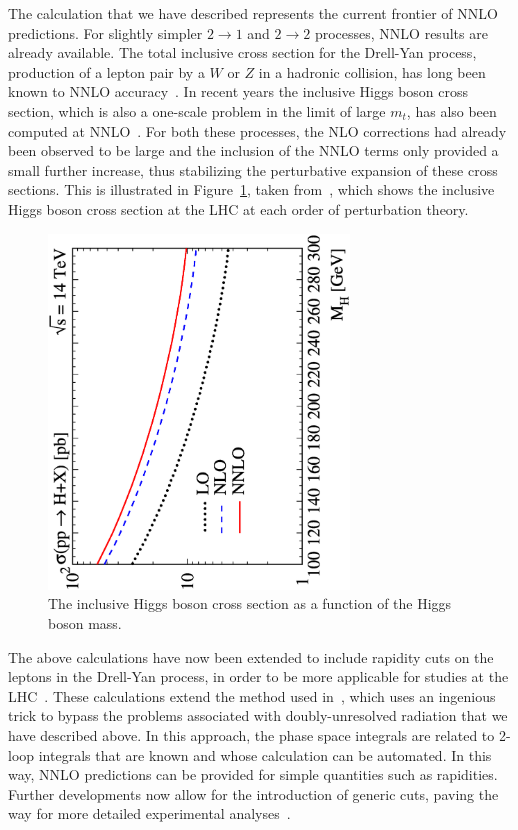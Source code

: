\documentclass[12pt]{iopart}
\begin{document}
The calculation that we have described represents the current frontier of NNLO
predictions. For slightly simpler $2 \to 1$ and $2 \to 2$ processes, NNLO results
are already available. The total inclusive cross section for the Drell-Yan
process, production of a lepton pair by a $W$ or $Z$ in a hadronic collision, has
long been known to NNLO accuracy~\cite{Hamberg:1990np}. In recent years the
inclusive Higgs boson cross section, which is also a one-scale problem in the
limit of large $m_t$, has also been computed at
NNLO~\cite{Harlander:2002wh,Anastasiou:2002yz}. For both these processes, the NLO
corrections had already been observed to be large and the inclusion of the NNLO
terms only provided a small further increase, thus stabilizing the perturbative
expansion of these cross sections. This is illustrated in Figure~\ref{fig:hxsec},
taken from~\cite{Harlander:2002wh},
which shows the inclusive Higgs boson cross section at the LHC at each order of
perturbation theory.
%
\begin{figure}[t]
\begin{center}
\includegraphics[width=8cm,angle=-90]{higgsxsec.eps}
\end{center}
\caption{The inclusive Higgs boson cross section as a function of the
Higgs boson mass.}
\label{fig:hxsec}
\end{figure}

The above calculations have now been extended to include rapidity cuts on the
leptons in the Drell-Yan process, in order to be more applicable for studies at
the LHC~\cite{Anastasiou:2003yy}. These calculations extend the method used
in~\cite{Anastasiou:2002yz}, which uses an ingenious trick to bypass the problems
associated with doubly-unresolved radiation that we have described above. In this
approach, the phase space integrals are related to 2-loop integrals that are known
and whose calculation can be automated. In this way, NNLO predictions can be
provided for simple quantities such as rapidities. Further developments now allow
for the introduction of generic cuts, paving the way for more detailed
experimental analyses~\cite{Anastasiou:2004xq}.
\end{document}
